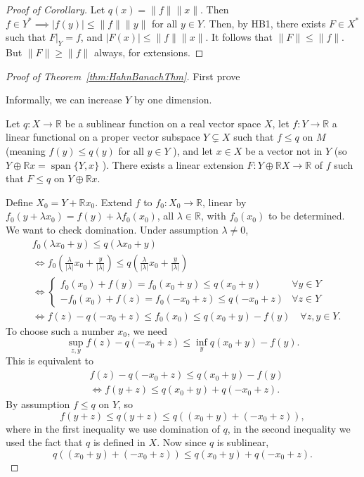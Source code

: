 \begin{proof}[Proof of Corollary]
	Let $q(x) = \| f\| \| x\|$. Then $f \in Y^* \implies |f(y)| \le  \|f\| \|y\|$ for all $y \in Y$. Then, by HB1, there exists $F \in X^*$ such that $F|_Y = f$, and $|F(x)| \le \|f\| \|x\|$.
	It follows that $\|F\| \le  \|f\|$. But $\|F\| \ge  \|f\|$ always, for extensions.
\end{proof}

\begin{proof}[Proof of Theorem~\ref{thm:HahnBanachThm}]
	First prove
	\begin{lemma}
		\label{lem:Banachlem}
		Informally, we can increase $Y$ by one dimension.

		Let $q: X \rightarrow \mathbb{R}$ be a sublinear function on a real vector space $X$, let $f: Y \rightarrow \mathbb{R}$ a linear functional on a proper vector subspace $Y \subsetneq X$ such that $f \leq q$ on $M$ (meaning $f(y) \leq q(y)$ for all $y \in Y$ ), and let $x \in X$ be a vector not in $Y$ (so $Y \oplus \mathbb{R} x=\operatorname{span}\{Y, x\}$ ). There exists a linear extension $F: Y \oplus \mathbb{R} X \rightarrow \mathbb{R}$ of $f$ such that $F \leq q$ on $Y \oplus \mathbb{R} x$.
	\end{lemma}
	Define $X_0 = Y + \mathbb{R} x_0$. Extend $f$ to $f_0: X_0 \to \mathbb{R}$, linear by $f_0(y + \lambda x_0) = f(y) + \lambda f_0(x_0)$, all $\lambda \in \mathbb{R}$, with $f_0(x_0)$ to be determined. We want to check domination. Under assumption $\lambda \neq 0$,
	\begin{align*}
		& f_0(\lambda x_0 + y) \le  q(\lambda x_0 +  y) \\
		&\iff  f_0\left( \frac{\lambda}{|\lambda|} x_0 + \frac{y}{|\lambda|} \right) \le q\left(  \frac{\lambda}{|\lambda|} x_0 + \frac{y}{|\lambda|}  \right) \\
		&\iff \begin{cases}
			f_0(x_0) + f(y) = f_0(x_0 + y) \le q(x_0 + y) & \forall y \in Y \\
			-f_0(x_0) + f(z) = f_0(-x_0 + z) \le q(- x_0 + z) & \forall  z \in Y
		\end{cases}\\
		&\iff f(z) - q(- x_0 + z) \le f_0(x_0) \le  q(x_0 + y) - f(y) \quad \forall  z, y \in Y
	.\end{align*}
	To choose such a number $x_0$, we need
	\[
		\sup _{z, y} f(z) - q(- x_0 + z) 
		\le \inf _{y} q(x_0 + y) - f(y)
	.\] 
	This is equivalent to
	\begin{align*}
		&f(z) - q(-x_0 + z) \le q(x_0 + y) - f(y)\\
		&\iff f(y + z) \le q(x_0 + y) + q(-x_0 + z)
	.\end{align*}
	By assumption $f \le q$ on $Y$, so 
	\[
		f(y + z) \le q(y + z) \le q\left( (x_0 + y) + (-x_0 + z) \right) 
	,\] 
	where in the first inequality we use domination of $q$, in the second inequality we used the fact that $q$ is defined in $X$. Now since  $q$ is sublinear,
	\[
		 q\left( (x_0 + y) + (-x_0 + z) \right) \le q(x_0 + y) + q(-x_0 + z) 
	.\] 


\end{proof}
